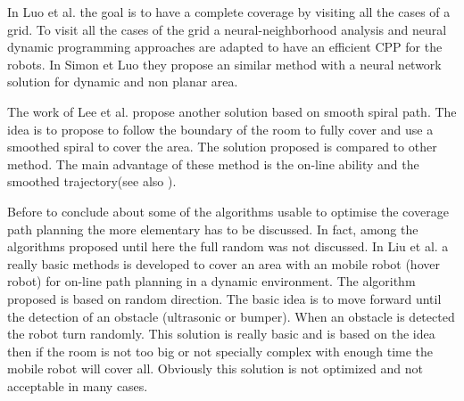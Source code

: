 		In Luo et al. \citep{216*luo2002} the goal is to have a complete coverage by visiting all the cases of a grid. To visit all the cases of the grid a neural-neighborhood analysis and neural dynamic programming approaches are adapted to have an efficient CPP for the robots. In Simon et Luo \citep{196*yang2004} they propose an similar method with a neural network solution for dynamic and non planar area.
		
		The work of Lee et al. \cite{215*lee2010} propose another solution based on smooth spiral path. The idea is to propose to follow the boundary of the room to fully cover and use a smoothed spiral to cover the area. The solution proposed is compared to other method. The main advantage of these method is the on-line ability and the smoothed trajectory(see also \citep{195*choi2009}).
		
		Before to conclude about some of the algorithms usable to optimise the coverage path planning the more elementary has to be discussed. In fact,  among the algorithms proposed until here the full random was not discussed. 
		In Liu et al. \cite{242*liu2008} a really basic methods is developed to cover an area with an mobile robot (hover robot) for on-line path planning in a dynamic environment. The algorithm proposed is based on random direction. The basic idea is to move forward until the detection of an obstacle (ultrasonic or bumper). When an obstacle is detected the robot turn randomly. This solution is really basic and is based on the idea then if the room is not too big or not specially complex with enough time the mobile robot will cover all. Obviously this solution is not optimized and not acceptable in many cases. 
		
		


		


